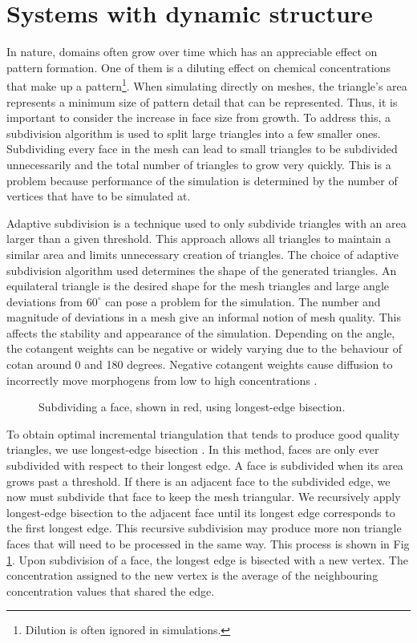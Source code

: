 \section{Systems with dynamic structure}
In nature, domains often grow over time which has an appreciable effect on pattern formation. One of them is a diluting effect on chemical concentrations that make up a pattern\footnote{Dilution is often ignored in simulations.}. When simulating directly on meshes, the triangle's area represents a minimum size of pattern detail that can be represented. Thus, it is important to consider the increase in face size from growth. To address this, a subdivision algorithm is used to split large triangles into a few smaller ones. Subdividing every face in the mesh can lead to small triangles to be subdivided unnecessarily and the total number of triangles to grow very quickly. This is a problem because performance of the simulation is determined by the number of vertices that have to be simulated at. 

Adaptive subdivision is a technique used to only subdivide triangles with an area larger than a given threshold. This approach allows all triangles to maintain a similar area and limits unnecessary creation of triangles. The choice of adaptive subdivision algorithm used determines the shape of the generated triangles. An equilateral triangle is the desired shape for the mesh triangles and large angle deviations from $60^{\circ}$ can pose a problem for the simulation. The number and magnitude of deviations in a mesh give an informal notion of mesh quality. This affects the stability and appearance of the simulation. Depending on the angle, the cotangent weights can be negative or widely varying due to the behaviour of cotan around 0 and 180 degrees. Negative cotangent weights cause diffusion to incorrectly move morphogens from low to high concentrations \citep{Wardetzky2007}. 

\begin{figure}[H]
	\centering
	\caption{Subdividing a face, shown in red, using longest-edge bisection.}
	\label{fig:recursiveSubdiv}
\end{figure}

To obtain optimal incremental triangulation that tends to produce good quality triangles, we use longest-edge bisection \citep{RIVARA1998}. In this method, faces are only ever subdivided with respect to their longest edge. A face is subdivided when its area grows past a threshold. If there is an adjacent face to the subdivided edge, we now must subdivide that face to keep the mesh triangular. We recursively apply longest-edge bisection to the adjacent face until its longest edge corresponds to the first longest edge. This recursive subdivision may produce more non triangle faces that will need to be processed in the same way. This process is shown in Fig \ref{fig:recursiveSubdiv}. Upon subdivision of a face, the longest edge is bisected with a new vertex. The concentration assigned to the new vertex is the average of the neighbouring concentration values that shared the edge.

